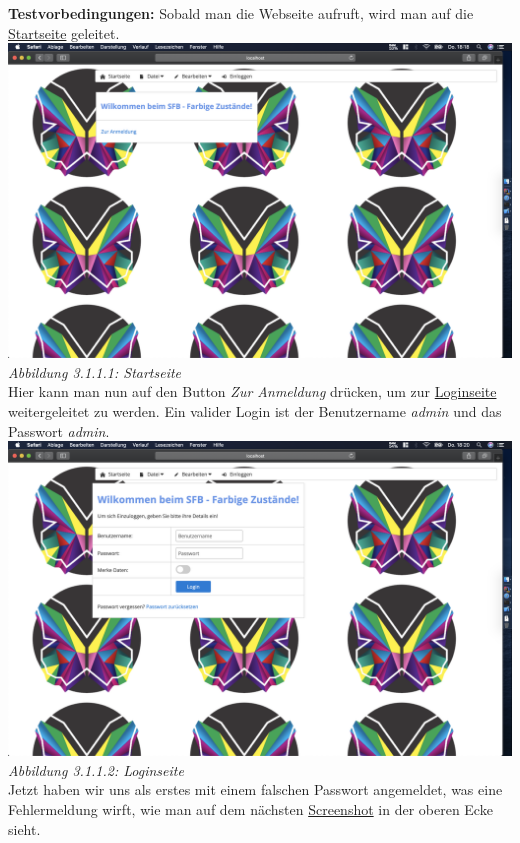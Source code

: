\documentclass[enabledeprecatedfontcommands,fontsize=12pt,paper=a4,twoside]{scrartcl}
\begin{document}
\textbf{Testvorbedingungen:} Sobald man die Webseite aufruft, wird man auf die \hyperlink{sc3.1.1.1}{Startseite}  geleitet. \\

\hypertarget{sc3.1.1.1}{
\includegraphics[width=1\textwidth]{Screenshots/311StartSite.png}
\textit{Abbildung 3.1.1.1: Startseite}
} \\

Hier kann man nun auf den Button \textit{Zur Anmeldung} drücken, um zur \hyperlink{sc3.1.1.2}{Loginseite} weitergeleitet zu werden. Ein valider Login ist der Benutzername \textit{admin} und das Passwort \textit{admin}. \\

\hypertarget{sc3.1.1.2}{
\includegraphics[width=1\textwidth]{Screenshots/311LoginSite.png}
\textit{Abbildung 3.1.1.2: Loginseite}
} \\

Jetzt haben wir uns als erstes mit einem falschen Passwort angemeldet, was eine Fehlermeldung wirft, wie man auf dem nächsten  \hyperlink{sc3.1.1.3}{Screenshot} in der oberen Ecke sieht.\\
\end{document}
